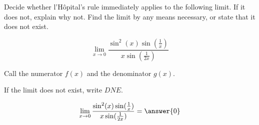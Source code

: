 \documentclass{ximera}
\author{Steven Gubkin}
\begin{document}
\begin{exercise}

Decide whether l'H\^{o}pital's rule immediately applies to the following limit.  If it does not, explain why not.  Find the limit by any means necessary, or state that it does not exist. 

\[
\lim_{x \to 0} \frac{\sin^2(x)\sin(\frac{1}{x})}{x\sin(\frac{1}{2x})}
\]

\begin{prompt}
	Call the numerator $f(x)$ and the denominator $g(x)$. 

	\begin{multipleChoice}
\end{multipleChoice}

If the limit does not exist, write $DNE$.

\[
\lim_{x \to 0} \frac{\sin^2(x)\sin(\frac{1}{x})}{x\sin(\frac{1}{2x})} = \answer{0}
\]

\end{prompt}

\end{exercise}
\end{document}
